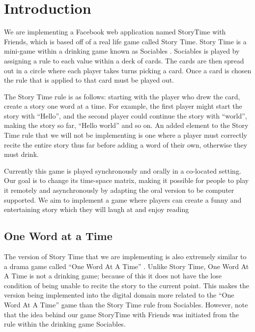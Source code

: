 \documentclass{sigchi}
\begin{document}

\section{Introduction}
We are implementing a Facebook web application named StoryTime with Friends, which is based off of a real life game called Story Time. Story Time is a mini-game within a drinking game known as Sociables \cite{sociablesrules}. Sociables is played by assigning a rule to each value within a deck of cards. The cards are then spread out in a circle where each player takes turns picking a card. Once a card is chosen the rule that is applied to that card must be played out. 

The Story Time rule is as follows: starting with the player who drew the card, create a story one word at a time. For example, the first player might start the story with ``Hello'', and the second player could continue the story with ``world'', making the story so far, ``Hello world'' and so on. An added element to the Story Time rule that we will not be implementing is one where a player must correctly recite the entire story thus far before adding a word of their own, otherwise they must drink. 

Currently this game is played synchronously and orally in a co-located setting. Our goal is to change its time-space matrix, making it possible for people to play it remotely and asynchronously by adapting the oral version to be computer supported. We aim to implement a game where players can create a funny and entertaining story which they will laugh at and enjoy reading

\subsection{One Word at a Time}
The version of Story Time that we are implementing is also extremely similar to a drama game called ``One Word At A Time'' \cite{dramaresource, izzyg, sociablesrules}. Unlike Story Time, One Word At A Time is not a drinking game; because of this it does not have the lose condition of being unable to recite the story to the current point. This makes the version being implemented into the digital domain more related to the ``One Word At A Time'' game than the Story Time rule from Sociables. However, note that the idea behind our game StoryTime with Friends was initiated from the rule within the drinking game Sociables.
\end{document}

